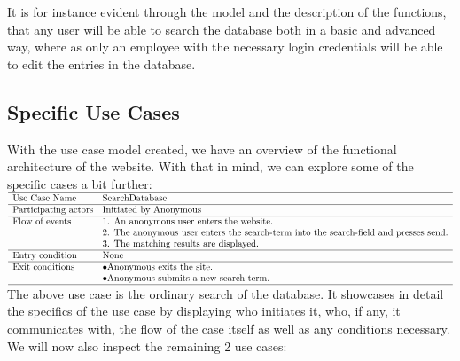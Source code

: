 \documentclass[12pt,a4paper]{article}
\begin{document}
It is for instance evident through the model and the description of the functions, that any user will be able to search the database both in a basic and advanced way, where as only an employee with the necessary login credentials will be able to edit the entries in the database.
\newpage

\subsection{Specific Use Cases}

With the use case model created, we have an overview of the functional architecture of the website. With that in mind, we can explore some of the specific cases a bit further:\\

$\begin{array}{ll}
\hline
\text{Use Case Name}	& \text{SearchDatabase}\\
\hline
\text{Participating
	actors}	& \text{Initiated by Anonymous}\\
\hline
\text{Flow of events}	& \text{1. An anonymous user enters the website.}\\
& \text{2. The anonymous user enters the search-term into the search-field and presses send.} \\
& \text{3. The matching results are displayed.}\\
\hline
\text{Entry condition}	& \text{None}\\
\hline
\text{Exit conditions}	& \bullet \text{Anonymous exits the site.}\\
& \bullet \text{Anonymous submits a new search term.}\\
\hline
\end{array}$
\\

The above use case is the ordinary search of the database. It showcases in detail the specifics of the use case by displaying who initiates it, who, if any, it communicates with, the flow of the case itself as well as any conditions necessary.
We will now also inspect the remaining 2 use cases:\\
\end{document}
